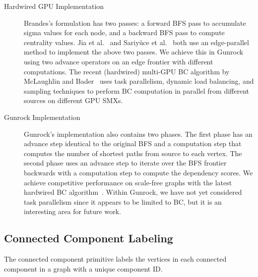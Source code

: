 \documentclass[format=acmsmall,review=false,screen=true]{acmart}
\begin{document}
\begin{description}
\item[Hardwired GPU Implementation] Brandes's formulation has two
  passes: a forward BFS pass to accumulate sigma values for each node,
  and a backward BFS pass to compute centrality values. Jia et
  al.~ and Sariy\"{u}ce et
  al.~ both use an edge-parallel method
  to implement the above two passes. We achieve this in Gunrock using
  two advance operators on an edge frontier with different
  computations. The recent (hardwired) multi-GPU BC algorithm by
  McLaughlin and Bader~ uses task
  parallelism, dynamic load balancing, and sampling techniques to
  perform BC computation in parallel from different sources on
  different GPU SMXs.

\item[Gunrock Implementation] Gunrock's implementation also contains
  two phases. The first phase has an advance step identical to the
  original BFS and a computation step that computes the number of
  shortest paths from source to each vertex. The second phase uses an
  advance step to iterate over the BFS frontier backwards with a
  computation step to compute the dependency scores. We achieve
  competitive performance on scale-free graphs with the latest
  hardwired BC algorithm~\cite{McLaughlin:2015:AFE}. Within Gunrock,
  we have not yet considered task parallelism since it appears to be
  limited to BC, but it is an interesting area for future work.
\begin{comment}
  We can generate the right frontier queue for each iteration in the
  backward phase using a filter operator or it can be saved directly
  during the forward BFS phase with extra memory cost.
\end{comment}
\end{description}

\subsection{Connected Component Labeling}

The connected component primitive labels the vertices in each
connected component in a graph with a unique component ID\@.
\end{document}
